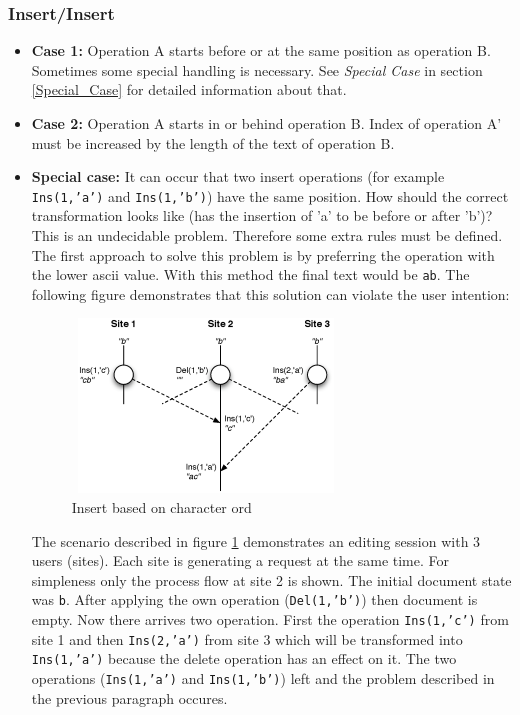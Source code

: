\subsubsection{Insert/Insert}
\begin{itemize}
\item \textbf{Case 1:}
Operation A starts before or at the same position as operation B. Sometimes some special handling is necessary. See \emph{Special Case} in section \ref{Special_Case} for detailed information about that.
\item \textbf{Case 2:}
Operation A starts in or behind operation B. Index of operation A' must be increased by the length of the text of operation B.
\item \textbf{Special case:}
\label{Special_Case}
It can occur that two insert operations (for example \texttt{Ins(1,'a')} and \texttt{Ins(1,'b')}) have the same position. How should the correct transformation looks like (has the insertion of 'a' to be before or after 'b')? This is an undecidable problem. Therefore some extra rules must be defined. The first approach to solve this problem is by preferring the operation with the lower ascii value. With this method the final text would be \texttt{ab}. The following figure demonstrates that this solution can violate the user intention:
\begin{figure}[H]
\centering
\includegraphics[height=4.63cm,width=7.12cm]{../../images/algo-impl/transform_ins_ins_charpos.eps}
\caption{Insert based on character ord}
\label{Insert based on character ord}
\end{figure}
The scenario described in figure \ref{Insert based on character ord} demonstrates an editing session with 3 users (sites). Each site is generating a request at the same time. For simpleness only the process flow at site 2 is shown. The initial document state was \texttt{b}. After applying the own operation (\texttt{Del(1,'b')}) then document is empty. Now there arrives two operation. First the operation \texttt{Ins(1,'c')} from site 1 and then \texttt{Ins(2,'a')} from site 3 which will be transformed into \texttt{Ins(1,'a')} because the delete operation has an effect on it. The two operations (\texttt{Ins(1,'a')} and \texttt{Ins(1,'b')}) left and the problem described in the previous paragraph occures.


\end{itemize}
